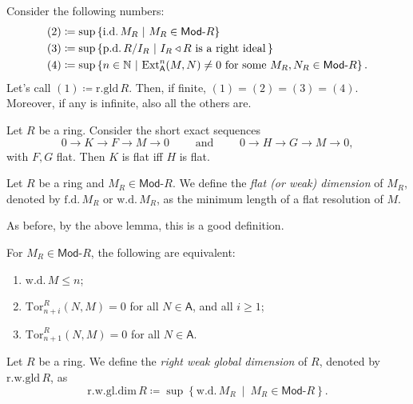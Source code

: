 \begin{thm}
	Consider the following numbers:
	\begin{align}
		(2) &\coloneqq \sup \left\{ \mathrm{i.d.}\, M_R \ \middle|\ M_R \in \mathsf{Mod}\text{-}R \right\}\\
		(3) &\coloneqq \sup \left\{ \mathrm{p.d.}\, R/I_R \ \middle|\ I_R \triangleleft R 
		\text{ is a right ideal}\, \right\}\\
		(4) &\coloneqq \sup \left\{n \in \N \ \middle|\ \mathrm{Ext}^n_{\mathsf{A}}(M,N) \neq 0
		\text{ for some } M_R, N_R \in \mathsf{Mod}\text{-}R \right\}
	.\end{align} 
	Let's call $(1) \coloneqq \mathrm{r.gld}\, R$.
	Then, if finite, $(1) = (2) = (3) = (4)$.
	Moreover, if any is infinite, also all the others are.
\end{thm}

\begin{lem}
	Let $R$ be a ring.
	Consider the short exact sequences
	\begin{equation}
	0 \to K \to F \to M \to 0
	\qquad \text{ and } \qquad
	0 \to H \to G \to M \to 0
	,\end{equation} 
	with $F, G$ flat.
	Then $K$ is flat iff $H$ is flat.
\end{lem} 

\begin{defn}
	Let $R$ be a ring and $M_R \in \mathsf{Mod}\text{-}R$.
	We define the {\em flat (or weak) dimension} of $M_R$,
	denoted by $\mathrm{f.d.}\, M_R$ or $\mathrm{w.d.}\, M_R$,
	as the minimum length of a flat resolution of $M$.
\end{defn}
\begin{rem}[]
	As before, by the above lemma, this is a good definition.
\end{rem}

\begin{prop}
	For $M_R \in \mathsf{Mod}\text{-}R$, the following are equivalent:
	\begin{enumerate}
		\item $\mathrm{w.d.}\, M \leq n$;
		\item $\mathrm{Tor}_{n+i}^R (N,M) = 0$ for all $N \in \mathsf{A}$, and all $i \geq 1$;
		\item $\mathrm{Tor}_{n+1}^R (N,M) = 0$ for all $N \in \mathsf{A}$.
	\end{enumerate}
\end{prop} 

\begin{defn}
	Let $R$ be a ring.
	We define the {\em right weak global dimension} of $R$,
	denoted by $\mathrm{r.w.gld}\, R$,
	as
	\begin{equation}
	\mathrm{r.w.gl.dim}\, R \coloneqq \sup \left\{ \mathrm{w.d.}\, M_R \ \middle|\ M_R \in \mathsf{Mod}\text{-}R \right\}
	.\end{equation} 
\end{defn}

